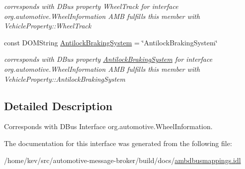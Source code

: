 \begin{DoxyCompactItemize}
\begin{DoxyCompactList}\small\item\em corresponds with D\+Bus property Wheel\+Track for interface org.\+automotive.\+Wheel\+Information A\+M\+B fulfills this member with Vehicle\+Property\+::\+Wheel\+Track \end{DoxyCompactList}\item 
\hypertarget{interfaceWheelInformation_a4c15409b80fb3b9ab163702d5870594b}{const D\+O\+M\+String \hyperlink{interfaceWheelInformation_a4c15409b80fb3b9ab163702d5870594b}{Antilock\+Braking\+System} = \char`\"{}Antilock\+Braking\+System\char`\"{}}\label{interfaceWheelInformation_a4c15409b80fb3b9ab163702d5870594b}

\begin{DoxyCompactList}\small\item\em corresponds with D\+Bus property \hyperlink{interfaceAntilockBrakingSystem}{Antilock\+Braking\+System} for interface org.\+automotive.\+Wheel\+Information A\+M\+B fulfills this member with Vehicle\+Property\+::\+Antilock\+Braking\+System \end{DoxyCompactList}\end{DoxyCompactItemize}


\subsection{Detailed Description}
Corresponds with D\+Bus Interface org.\+automotive.\+Wheel\+Information. 

The documentation for this interface was generated from the following file\+:\begin{DoxyCompactItemize}
\item 
/home/kev/src/automotive-\/message-\/broker/build/docs/\hyperlink{ambdbusmappings_8idl}{ambdbusmappings.\+idl}\end{DoxyCompactItemize}
